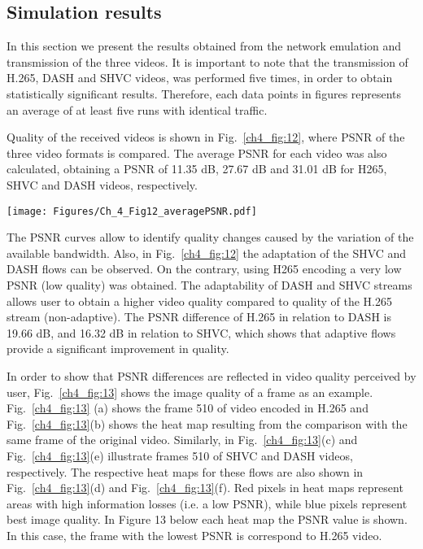 \subsection{Simulation results}
\label{subsec:4.5.2}

In this section we present the results obtained from the network emulation and transmission of the three videos. It is important to note that the transmission of H.265, DASH and SHVC videos, was performed five times, in order to obtain statistically significant results. Therefore, each data points in figures represents an average of at least five runs with identical traffic.

Quality of the received videos is shown in Fig.~\ref{ch4_fig:12}, where PSNR of the three video formats is compared. The average PSNR for each video was also calculated, obtaining a PSNR of 11.35 dB, 27.67 dB and 31.01 dB for H265, SHVC and DASH videos, respectively.

\begin{center}
\texttt{[image: Figures/Ch\_4\_Fig12\_averagePSNR.pdf]}
\label{ch4_fig:12}       %
\end{center}


The PSNR curves allow to identify quality changes caused by the variation of the available bandwidth. Also, in Fig.~\ref{ch4_fig:12} the adaptation of the SHVC and DASH flows can be observed. On the contrary, using H265 encoding a very low PSNR (low quality) was obtained. The adaptability of DASH and SHVC streams allows user to obtain a higher video quality compared to quality of the H.265 stream (non-adaptive). The PSNR difference of H.265 in relation to DASH is 19.66 dB, and 16.32 dB in relation to SHVC, which shows that adaptive flows provide a significant improvement in quality.

In order to show that PSNR differences are reflected in video quality perceived by user, Fig.~\ref{ch4_fig:13} shows the image quality of a frame as an example. Fig.~\ref{ch4_fig:13} (a) shows the frame 510 of video encoded in H.265 and Fig.~\ref{ch4_fig:13}(b) shows the heat map resulting from the comparison with the same frame of the original video. Similarly, in Fig.~\ref{ch4_fig:13}(c) and Fig.~\ref{ch4_fig:13}(e) illustrate frames 510 of SHVC and DASH videos, respectively. The respective heat maps for these flows are also shown in Fig.~\ref{ch4_fig:13}(d) and Fig.~\ref{ch4_fig:13}(f). Red pixels in heat maps represent areas with high information losses (i.e. a low PSNR), while blue pixels represent best image quality. In Figure 13 below each heat map the PSNR value is shown. In this case, the frame with the lowest PSNR is correspond to H.265 video.

